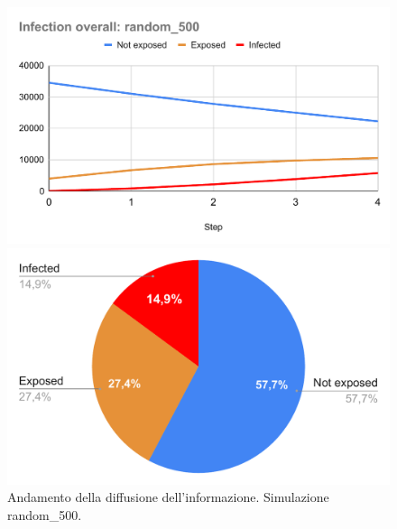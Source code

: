             \begin{figure}[H]
                \centering
                \begin{minipage}[c]{0.55\textwidth}
                    \includegraphics[width=\textwidth]{resources/charts/Infection overall_ random_500.pdf}
                \end{minipage}
                \hfill
                \begin{minipage}[c]{0.44\textwidth}
                    \includegraphics[width=\textwidth]{resources/charts/pie_random_500.pdf}
                \end{minipage}
                \caption{Andamento della diffusione dell'informazione. Simulazione random\_500.}
            \end{figure}
            

